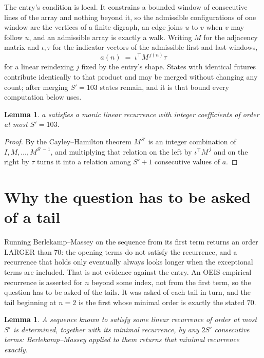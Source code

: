 \documentclass[11pt,a4paper]{article}
\theoremstyle{plain}
\newtheorem{lemma}[theorem]{Lemma}
\theoremstyle{definition}
\begin{document}
The entry's condition is local. It constrains a bounded window of consecutive lines of the
array and nothing beyond it, so the admissible configurations of one window are the vertices of
a finite digraph, an edge joins $u$ to $v$ when $v$ may follow $u$, and an admissible array is
exactly a walk. Writing $M$ for the adjacency matrix and $\iota,\tau$ for the indicator vectors
of the admissible first and last windows,
\[
a(n)\;=\;\iota^{\!\top}M^{\,j(n)}\tau
\]
for a linear reindexing $j$ fixed by the entry's shape. States with identical futures
contribute identically to that product and may be merged without changing any count; after
merging $S'=103$ states remain, and it is that bound every computation below uses.

\begin{lemma}\label{lem:cf}
$a$ satisfies a monic linear recurrence with integer coefficients of order at most $S'=103$.
\end{lemma}

\begin{proof}
By the Cayley--Hamilton theorem $M^{S'}$ is an integer combination of $I,M,\dots,M^{S'-1}$,
and multiplying that relation on the left by $\iota^{\!\top}M^{\,j}$ and on the right by
$\tau$ turns it into a relation among $S'+1$ consecutive values of $a$.
\end{proof}

\section{Why the question has to be asked of a tail}

Running Berlekamp--Massey on the sequence from its first term returns an order LARGER than $70$: the opening terms do not satisfy the recurrence, and a recurrence that holds only eventually always looks longer when the exceptional terms are included. That is not evidence against the entry. An OEIS empirical recurrence is asserted for $n$ beyond some index, not from the first term, so the question has to be asked of the tails. It was asked of each tail in turn, and the tail beginning at $n=2$ is the first whose minimal order is exactly the stated $70$.

\begin{lemma}\label{lem:bm}
A sequence known to satisfy some linear recurrence of order at most $S'$ is determined,
together with its minimal recurrence, by any $2S'$ consecutive terms: Berlekamp--Massey applied
to them returns that minimal recurrence exactly.
\end{lemma}
\end{document}
